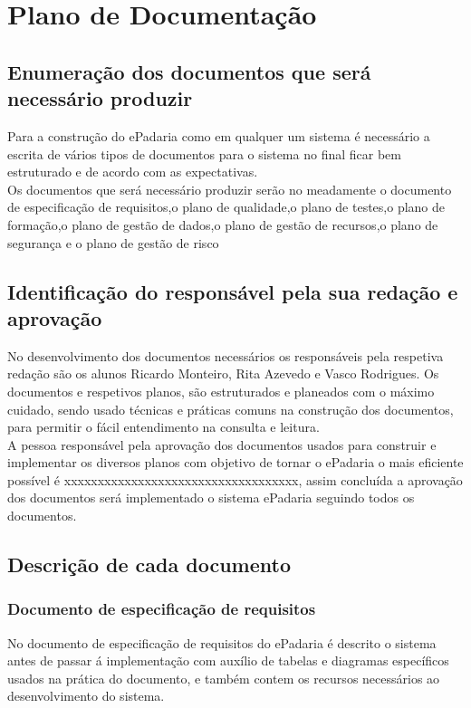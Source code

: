\chapter{Plano de Documentação}
\label{plano_de_documentacao}

\section{Enumeração dos documentos que será necessário produzir}
Para a construção do ePadaria como em qualquer um sistema é necessário a escrita de vários tipos de documentos para o sistema no final ficar bem estruturado e de acordo com as expectativas.\\
Os documentos que será necessário produzir serão no
meadamente o documento de especificação de requisitos,o plano de qualidade,o plano de testes,o plano de formação,o plano de gestão de dados,o plano de gestão de recursos,o plano de segurança e o plano de gestão de risco
\section{Identificação do responsável pela sua redação e aprovação}
No desenvolvimento dos documentos necessários os responsáveis pela respetiva redação são os alunos Ricardo Monteiro, Rita Azevedo e Vasco Rodrigues. Os documentos e respetivos planos, são estruturados e planeados com o máximo cuidado, sendo usado técnicas e práticas comuns na construção dos documentos, para permitir o fácil entendimento na consulta e leitura.\\
A pessoa responsável pela aprovação dos documentos usados para construir e implementar os diversos planos com objetivo de tornar o ePadaria o mais eficiente possível é xxxxxxxxxxxxxxxxxxxxxxxxxxxxxxxxxxx, assim concluída a aprovação dos documentos será implementado o sistema ePadaria seguindo todos os documentos.


\section{Descrição de cada documento}
\subsection{Documento de especificação de requisitos}
No documento de especificação de requisitos do ePadaria é descrito o sistema antes de passar á implementação com auxílio de tabelas e diagramas específicos usados na prática do documento, e também contem os recursos necessários ao desenvolvimento do sistema. 

